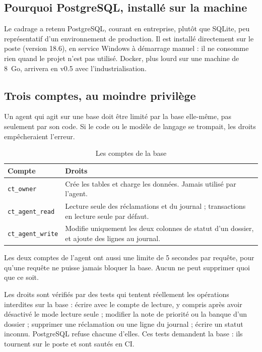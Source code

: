 \documentclass[11pt,a4paper]{article}
\begin{document}
\subsection{Pourquoi PostgreSQL, installé sur la machine}

Le cadrage a retenu PostgreSQL, courant en entreprise, plutôt que SQLite, peu représentatif d'un environnement de production. Il est installé directement sur le poste (version 18.6), en service Windows à démarrage manuel : il ne consomme rien quand le projet n'est pas utilisé. Docker, plus lourd sur une machine de 8~Go, arrivera en v0.5 avec l'industrialisation.

\subsection{Trois comptes, au moindre privilège}

Un agent qui agit sur une base doit être limité par la base elle-même, pas seulement par son code. Si le code ou le modèle de langage se trompait, les droits empêcheraient l'erreur.

\begin{table}[H]
\centering\small
\begin{tabularx}{\linewidth}{@{}l Y@{}}
\toprule
Compte & Droits \\
\midrule
\texttt{ct\_owner} & Crée les tables et charge les données. Jamais utilisé par l'agent. \\
\texttt{ct\_agent\_read} & Lecture seule des réclamations et du journal ; transactions en lecture seule par défaut. \\
\texttt{ct\_agent\_write} & Modifie uniquement les deux colonnes de statut d'un dossier, et ajoute des lignes au journal. \\
\bottomrule
\end{tabularx}
\caption{Les comptes de la base}
\end{table}

Les deux comptes de l'agent ont aussi une limite de 5 secondes par requête, pour qu'une requête ne puisse jamais bloquer la base. Aucun ne peut supprimer quoi que ce soit.

Les droits sont vérifiés par des tests qui tentent réellement les opérations interdites sur la base : écrire avec le compte de lecture, y compris après avoir désactivé le mode lecture seule ; modifier la note de priorité ou la banque d'un dossier ; supprimer une réclamation ou une ligne du journal ; écrire un statut inconnu. PostgreSQL refuse chacune d'elles. Ces tests demandent la base : ils tournent sur le poste et sont sautés en CI.
\end{document}
